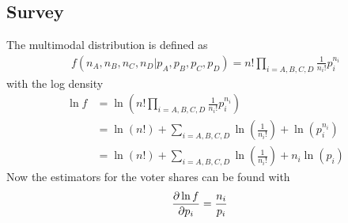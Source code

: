 \subsection{Survey}
The multimodal distribution is defined as
\begin{align}
    f\left(n_A,n_B,n_C,n_D\vert p_A,p_B,p_C,p_D\right)=n!\prod_{i=A,B,C,D}\frac{1}{n_i!}p_i^{n_i}
\end{align}
with the log density
\begin{align}
    \ln f &= \ln\left(n!\prod_{i=A,B,C,D}\frac{1}{n_i!}p_{i}^{n_i}\right)
    \\&=\ln\left(n!\right)+\sum_{i=A,B,C,D}\ln\left(\frac{1}{n_i!}\right)+\ln\left(p_i^{n_i}\right)
    \\&=\ln\left(n!\right)+\sum_{i=A,B,C,D}\ln\left(\frac{1}{n_i!}\right)+n_i\ln\left(p_i\right)
\end{align}
Now the estimators for the voter shares can be found with
\begin{align}
    \pdv{\ln f}{p_i}&=\frac{n_i}{p_i}
\end{align}
